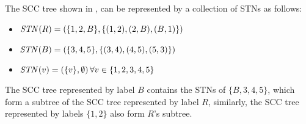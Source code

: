 The SCC tree shown in \figureref{\ref{fig:figure_with_subfigures}}, can be represented by a collection of STNs as follows:
\begin{itemize}
    \item $\text{\textit{STN}}(R)=(\{1,2,B\}, \{(1,2), (2,B), (B,1)\})$
    \item $\text{\textit{STN}}(B)=(\{3,4,5\}, \{(3,4), (4,5), (5,3)\})$
    \item $\text{\textit{STN}}(v)=\left(\{v\}, \emptyset\right) \forall v \in \{1,2,3,4,5\}$
\end{itemize}
The SCC tree represented by label $B$ contains the STNs of $\{B,3,4,5\}$, which form a subtree of the SCC tree represented by label $R$,
similarly, the SCC tree represented by labels $\{1,2\}$ also form $R$'s subtree.
